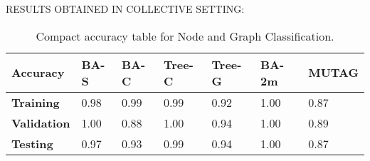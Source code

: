 RESULTS OBTAINED IN COLLECTIVE SETTING:

\begin{table}[h]
    \centering
    \scriptsize
    \begin{tabularx}{\linewidth}{l|X X X X|X X}
    \hline
    \textbf{Accuracy} & \textbf{BA-S} & \textbf{BA-C} & \textbf{Tree-C} & \textbf{Tree-G} & \textbf{BA-2m} & \textbf{MUTAG} \\
    \hline
    \textbf{Training}   & 0.98 & 0.99 & 0.99 & 0.92 & 1.00 & 0.87 \\
    \textbf{Validation} & 1.00 & 0.88 & 1.00 & 0.94 & 1.00 & 0.89 \\
    \textbf{Testing}    & 0.97 & 0.93 & 0.99 & 0.94 & 1.00 & 0.87 \\
    \hline
    \end{tabularx}
    \caption{Compact accuracy table for Node and Graph Classification.}
    \label{tab:compact-accuracy}
    \end{table}